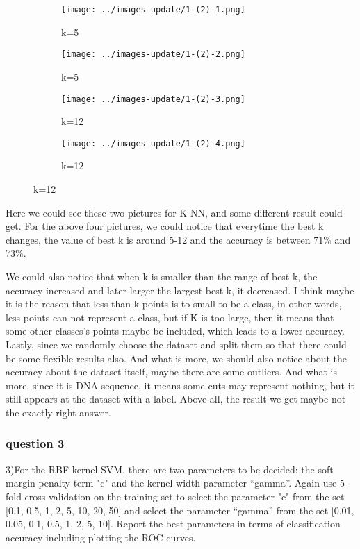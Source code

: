 \documentclass[]{article}
\begin{document}
\begin{figure}[p]
	\centering
	\begin{subfigure}{.5\textwidth}
		\centering
		\texttt{[image: ../images-update/1-(2)-1.png]}
		\caption{k=5}
		\label{fig:sub1}
	\end{subfigure}
	
	\begin{subfigure}{.5\textwidth}
		\centering
		\texttt{[image: ../images-update/1-(2)-2.png]}
		\caption{k=5}
		\label{fig:sub1}
	\end{subfigure}
	
	\begin{subfigure}{.5\textwidth}
		\centering
		\texttt{[image: ../images-update/1-(2)-3.png]}
		\caption{k=12}
		\label{fig:sub1}
	\end{subfigure}
	
	\begin{subfigure}{.5\textwidth}
		\centering
		\texttt{[image: ../images-update/1-(2)-4.png]}
		\caption{k=12}
		\label{fig:sub1}
	\end{subfigure}		
\end{figure}

Here we could see these two pictures for K-NN, and some different result could get. 
For the above four pictures, we could notice that everytime the best k changes, the value of best k is around 5-12 and the accuracy is between 71\% and 73\%.

We could also notice that when k is smaller than the range of best k, the accuracy increased and later larger the largest best k, it decreased. I think maybe it is the reason that less than k points is to small to be a class, in other words, less points can not represent a class, but if K is too large, then it means that some other classes's points maybe be included, which leads to a lower accuracy. Lastly, since we randomly choose the dataset and split them so that there could be some flexible results also.
And what is more, we should also notice about the accuracy about the dataset itself, maybe there are some outliers. And what is more, since it is DNA sequence, it means some cuts may represent nothing, but it still appears at the dataset with a label. Above all, the result we get maybe not the exactly right answer.




\subsubsection{question 3}
3)For the RBF kernel SVM, there are two parameters to be decided: the soft margin penalty term "c" and the kernel width parameter “gamma”. Again use 5-fold cross validation on the training set to select the parameter "c" from the set [0.1, 0.5, 1, 2, 5, 10, 20, 50] and select the parameter “gamma” from the set [0.01, 0.05, 0.1, 0.5, 1, 2, 5, 10]. Report the best parameters in terms of classification accuracy including plotting the ROC curves.
\end{document}
